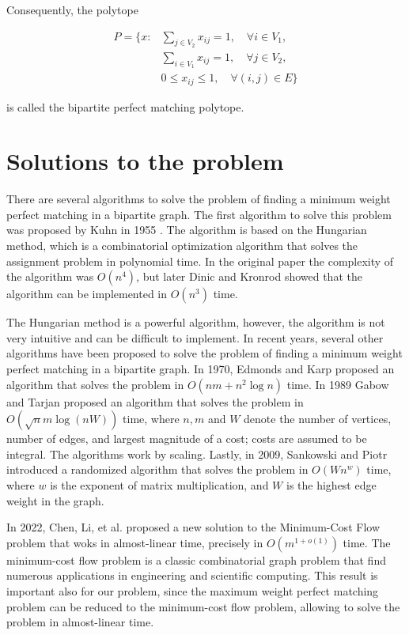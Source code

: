 Consequently, the polytope

\begin{equation}
    \begin{aligned}
        P = \{ x: & \sum_{j \in V_2} x_{ij} = 1, \quad \forall i \in V_1, \\
        & \sum_{i \in V_1} x_{ij} = 1, \quad \forall j \in V_2, \\
        & 0 \leq x_{ij} \leq 1, \quad \forall (i, j) \in E \}
    \end{aligned}
\end{equation}

is called the bipartite perfect matching polytope. 

\section{Solutions to the problem}
There are several algorithms to solve the problem of finding a minimum weight perfect matching in a bipartite graph. The first algorithm to solve this problem was proposed by Kuhn in 1955 \cite{kuhn1955hungarian}. The algorithm is based on the Hungarian method, which is a combinatorial optimization algorithm that solves the assignment problem in polynomial time. In the original paper the complexity of the algorithm was $O(n^4)$, but later Dinic and Kronrod \cite{dinic1969algorithm} showed that the algorithm can be implemented in $O(n^3)$ time.

The Hungarian method is a powerful algorithm, however, the algorithm is not very intuitive and can be difficult to implement. In recent years, several other algorithms have been proposed to solve the problem of finding a minimum weight perfect matching in a bipartite graph. In 1970, Edmonds and Karp \cite{edmonds1972theoretical} proposed an algorithm that solves the problem in $O(nm + n^2 \log n)$ time. In 1989 Gabow and Tarjan \cite{gabow1989faster} proposed an algorithm that solves the problem in $O(\sqrt{n}m \log(nW))$ time,  where $n,m$ and $W$ denote the number of vertices, number of edges, and largest magnitude of a cost; costs are assumed to be integral. The algorithms work by scaling. Lastly, in 2009, Sankowski and Piotr \cite{sankowski2009maximum} introduced a randomized algorithm that solves the problem in $O(Wn^w)$ time, where $w$ is the exponent of matrix multiplication, and $W$ is the highest edge weight in the graph.

In 2022, Chen, Li, et al. \cite{chen2022maximum} proposed a new solution to the Minimum-Cost Flow problem that woks in almost-linear time, precisely in $O(m^{1+o(1)})$ time. The minimum-cost flow problem is a classic combinatorial graph
problem that find numerous applications in engineering and
scientific computing. This result is important also for our problem, since the maximum weight perfect matching problem can be reduced to the minimum-cost flow problem, allowing to solve the problem in almost-linear time.

